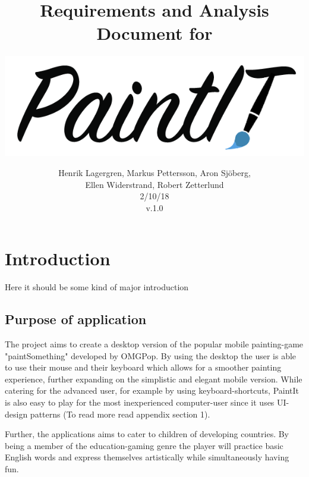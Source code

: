 \documentclass[12pt,a4paper]{scrartcl}
\title{Requirements and Analysis Document for }
\author{\includegraphics[width=\textwidth]{paintit.png}}
\date{Henrik Lagergren, Markus Pettersson, Aron Sj\"oberg, \\ Ellen Widerstrand, Robert Zetterlund \\ 2/10/18\\v.1.0}
\begin{document}
\maketitle
\thispagestyle{empty}

\newpage
\thispagestyle{empty}
\tableofcontents{}


\newpage

\section{Introduction}
Here it should be some kind of major introduction

\setcounter{page}{1}





\subsection{Purpose of application}
The project aims to create a desktop version of the popular mobile painting-game "paintSomething" developed by OMGPop. By using the desktop the user is able to use their mouse and their keyboard which allows for a smoother painting experience, further expanding on the simplistic and elegant mobile version. While catering for the advanced user, for example by using keyboard-shortcuts, PaintIt is also easy to play for the most inexperienced computer-user since it uses UI-design patterns (To read more read appendix section 1). 

Further, the applications aims to cater to children of developing countries. By being a member of the education-gaming genre the player will practice basic English words and express themselves artistically while simultaneously having fun.
\end{document}
